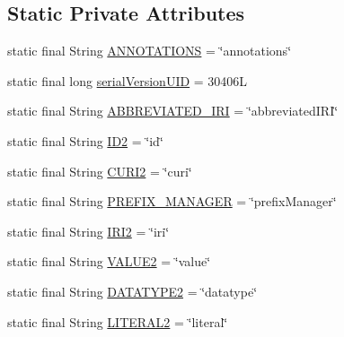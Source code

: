 \subsection*{Static Private Attributes}
\begin{DoxyCompactItemize}
\item 
static final String \hyperlink{classuk_1_1ac_1_1manchester_1_1cs_1_1owl_1_1owlapi_1_1_o_w_l_data_factory_impl_a752772e0b97ab57be919e20d0ccc4067}{A\-N\-N\-O\-T\-A\-T\-I\-O\-N\-S} = \char`\"{}annotations\char`\"{}
\item 
static final long \hyperlink{classuk_1_1ac_1_1manchester_1_1cs_1_1owl_1_1owlapi_1_1_o_w_l_data_factory_impl_a8a4263ad740632781959e4d60ad28035}{serial\-Version\-U\-I\-D} = 30406\-L
\item 
static final String \hyperlink{classuk_1_1ac_1_1manchester_1_1cs_1_1owl_1_1owlapi_1_1_o_w_l_data_factory_impl_a5e42a8ccec2810b371fc096f387eaaf5}{A\-B\-B\-R\-E\-V\-I\-A\-T\-E\-D\-\_\-\-I\-R\-I} = \char`\"{}abbreviated\-I\-R\-I\char`\"{}
\item 
static final String \hyperlink{classuk_1_1ac_1_1manchester_1_1cs_1_1owl_1_1owlapi_1_1_o_w_l_data_factory_impl_a670bebb4b7d3718b14feabf392c5517e}{I\-D2} = \char`\"{}id\char`\"{}
\item 
static final String \hyperlink{classuk_1_1ac_1_1manchester_1_1cs_1_1owl_1_1owlapi_1_1_o_w_l_data_factory_impl_ae412ff294c79dd47f8e3e0f6d522fb9f}{C\-U\-R\-I2} = \char`\"{}curi\char`\"{}
\item 
static final String \hyperlink{classuk_1_1ac_1_1manchester_1_1cs_1_1owl_1_1owlapi_1_1_o_w_l_data_factory_impl_a431dec54969eee27b4bf8a73264e5e9e}{P\-R\-E\-F\-I\-X\-\_\-\-M\-A\-N\-A\-G\-E\-R} = \char`\"{}prefix\-Manager\char`\"{}
\item 
static final String \hyperlink{classuk_1_1ac_1_1manchester_1_1cs_1_1owl_1_1owlapi_1_1_o_w_l_data_factory_impl_ab2c3e3f29f9b6eb0ec2ec3a84e810910}{I\-R\-I2} = \char`\"{}iri\char`\"{}
\item 
static final String \hyperlink{classuk_1_1ac_1_1manchester_1_1cs_1_1owl_1_1owlapi_1_1_o_w_l_data_factory_impl_a204be7b0deeeb68aa4c85f6a3b987673}{V\-A\-L\-U\-E2} = \char`\"{}value\char`\"{}
\item 
static final String \hyperlink{classuk_1_1ac_1_1manchester_1_1cs_1_1owl_1_1owlapi_1_1_o_w_l_data_factory_impl_a39252b2e64d37c354e8215748cd6af85}{D\-A\-T\-A\-T\-Y\-P\-E2} = \char`\"{}datatype\char`\"{}
\item 
static final String \hyperlink{classuk_1_1ac_1_1manchester_1_1cs_1_1owl_1_1owlapi_1_1_o_w_l_data_factory_impl_a36afeda2a52276c63936c969fb87b730}{L\-I\-T\-E\-R\-A\-L2} = \char`\"{}literal\char`\"{}

\end{DoxyCompactItemize}
